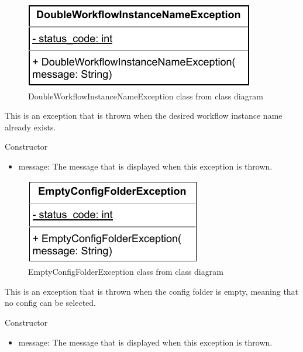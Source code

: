 
\begin{figure}[H]
    \centerline{\includegraphics[scale=1]{res/Klassen/DoubleWorkflowInstanceNameException.pdf}}
    \caption{DoubleWorkflowInstanceNameException class from class diagram}
\end{figure}

This is an exception that is thrown when the desired workflow instance name already exists.
\begin{methodenv}{Constructor}

\begin{itemize}
    \item{message:}
    The message that is displayed when this exception is thrown.
\end{itemize}
\end{methodenv}



\begin{figure}[H]
    \centerline{\includegraphics[scale=1]{res/Klassen/EmptyConfigFolderException.pdf}}
    \caption{EmptyConfigFolderException class from class diagram}
\end{figure}

This is an exception that is thrown when the config folder is empty, meaning that no config can be selected.
\begin{methodenv}{Constructor}

\begin{itemize}
    \item{message:}
    The message that is displayed when this exception is thrown.
\end{itemize}
\end{methodenv}



